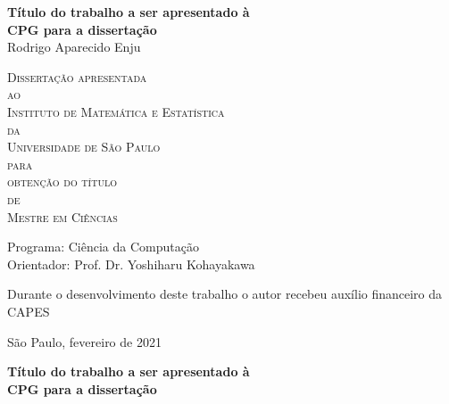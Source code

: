 \documentclass[11pt,twoside,a4paper]{book}
\newif\ifveroriginal
\newcommand{\formattedtitle}{Título do trabalho a ser apresentado à \\
    CPG para a dissertação}
\begin{document}
\frontmatter 
\fancyhead[RO]{{\footnotesize\rightmark}\hspace{2em}\thepage}
\setcounter{tocdepth}{2}
\fancyhead[LE]{\thepage\hspace{2em}\footnotesize{\leftmark}}
\fancyhead[RE,LO]{}
\fancyhead[RO]{{\footnotesize\rightmark}\hspace{2em}\thepage}

\onehalfspacing  %

\thispagestyle{empty}
\begin{center}
    \vspace*{2.3cm}
    \textbf{\Large{\formattedtitle}}\\
    
    \vspace*{1.2cm}
    \Large{Rodrigo Aparecido Enju}
    
    \vskip 2cm
    \textsc{
    Dissertação apresentada\\[-0.25cm] 
    ao\\[-0.25cm]
    Instituto de Matemática e Estatística\\[-0.25cm]
    da\\[-0.25cm]
    Universidade de São Paulo\\[-0.25cm]
    para\\[-0.25cm]
    obtenção do título\\[-0.25cm]
    de\\[-0.25cm]
    Mestre em Ciências}
    
    \vskip 1.5cm
    Programa: Ciência da Computação\\
    Orientador: Prof. Dr. Yoshiharu Kohayakawa

   	\vskip 1cm
    \normalsize{Durante o desenvolvimento deste trabalho o autor recebeu auxílio
    financeiro da CAPES}
    
    \vskip 0.5cm
    \normalsize{São Paulo, fevereiro de 2021}
\end{center}

%
%
%
\ifveroriginal
\newpage
\thispagestyle{empty}
    \begin{center}
        \vspace*{2.3 cm}
        \textbf{\Large{\formattedtitle}}\\
        \vspace*{2 cm}
    \end{center}
\end{document}
